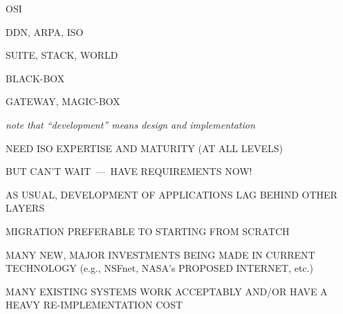 \begin{bwslide}

\begin{nrtc}
\item	OSI

\item	DDN, ARPA, ISO

\item	SUITE, STACK, WORLD

\item	BLACK-BOX

\item	GATEWAY, MAGIC-BOX
\end{nrtc}
\end{bwslide}


\begin{bwslide}
\vskip-0.5in
\end{bwslide}



\begin{note}\em
note that ``development'' means design and implementation
\end{note}


\begin{bwslide}

\begin{nrtc}
\item	NEED ISO EXPERTISE AND MATURITY (AT ALL LEVELS)
    \begin{nrtc}
    \item	BUT CAN'T WAIT~---~HAVE REQUIREMENTS NOW!

    \item	AS USUAL, DEVELOPMENT OF APPLICATIONS LAG BEHIND OTHER LAYERS
    \end{nrtc}

\item	MIGRATION PREFERABLE TO STARTING FROM SCRATCH
    \begin{nrtc}
    \item	MANY NEW, MAJOR INVESTMENTS BEING MADE IN CURRENT\\
		TECHNOLOGY (e.g., NSFnet, NASA's PROPOSED INTERNET, etc.)

    \item	MANY EXISTING SYSTEMS WORK ACCEPTABLY AND/OR HAVE A HEAVY
		RE-IMPLEMENTATION COST
    \end{nrtc}
\end{nrtc}
\end{bwslide}


